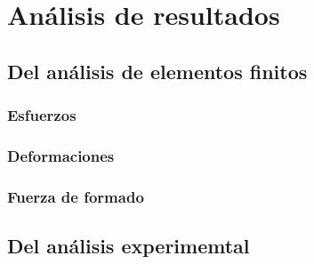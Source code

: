 \chapter{Análisis de resultados}

\section{Del análisis de elementos finitos}

\subsection{Esfuerzos}


\subsection{Deformaciones}

\subsection{Fuerza de formado}

\section{Del análisis experimemtal}


